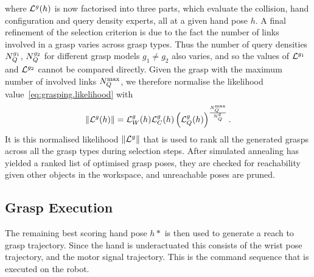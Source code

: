 where ${\cal L}^g(h)$ is now factorised into three parts, which evaluate the collision, hand configuration and query density experts, all at a given hand pose $h$. A final refinement  of the selection criterion is due to the fact the number of links involved in a grasp varies across grasp types. Thus the number of query densities $N^{g_1}_Q$, $N^{g_2}_Q$ for different grasp models $g_1 \neq g_2$ also varies, and so the values of ${\cal L}^{g_1}$ and ${\cal L}^{g_2}$ cannot be compared directly. Given the grasp with the maximum number of involved links $N^{\max}_Q$, we therefore normalise the likelihood value~\eqref{eq:grasping.likelihood} with
\begin{equation}
\left\|{\cal L}^g(h)\right\| = {\cal L}^g_\coll(h) {\cal L}^g_\hc(h) \left({\cal L}^g_\qd(h)\right)^{\frac{N^{\max}_\qd}{N^g_\qd}}.
\label{eq:grasping.likelihood.norm}
\end{equation}
It is this normalised likelihood $\left\|{\cal L}^g\right\|$ that is used to rank all the generated grasps across all the grasp types during selection steps. After simulated annealing has yielded a ranked list of optimised grasp poses, they are checked for reachability given other objects in the workspace, and unreachable poses are pruned. 

\subsection{Grasp Execution}
The remaining best scoring hand pose $h*$ is then used to generate a reach to grasp trajectory. Since the hand is underactuated this consists of the wrist pose trajectory, and the motor signal trajectory. This is the command sequence that is executed on the robot.